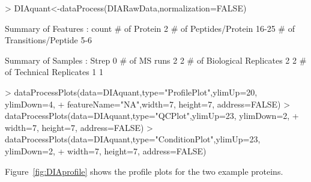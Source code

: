\documentclass[11pt]{article}
\def\figref#1{Figure~\ref{fig:#1}}
\begin{document}
\begin{small}
\begin{Schunk}
\begin{Sinput}
> DIAquant<-dataProcess(DIARawData,normalization=FALSE)
\end{Sinput}
\begin{Soutput}
  Summary of Features :
                         count
# of Protein                 2
# of Peptides/Protein    16-25
# of Transitions/Peptide   5-6
                      
  Summary of Samples :
                           Strep 0%
# of MS runs                      2         2
# of Biological Replicates        2         2
# of Technical Replicates         1         1
\end{Soutput}
\end{Schunk}

\begin{Schunk}
\begin{Sinput}
> dataProcessPlots(data=DIAquant,type="ProfilePlot",ylimUp=20, ylimDown=4,
+                  featureName="NA",width=7, height=7, address=FALSE)
> dataProcessPlots(data=DIAquant,type="QCPlot",ylimUp=23, ylimDown=2, 
+                  width=7, height=7, address=FALSE)
> dataProcessPlots(data=DIAquant,type="ConditionPlot",ylimUp=23, ylimDown=2,
+                  width=7, height=7, address=FALSE)
\end{Sinput}
\end{Schunk}
\end{small}

\figref{DIAprofile} shows the profile plots for the two example proteins.
\end{document}
